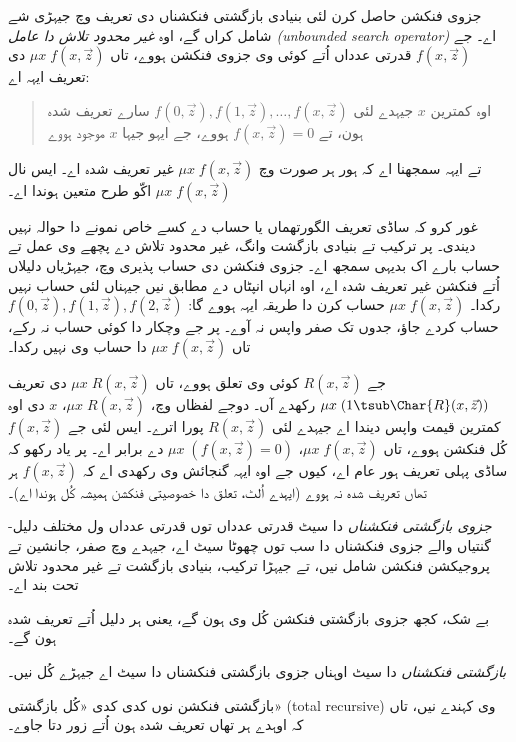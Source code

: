 \documentclass[../../../include/open-logic-section]{subfiles}
\begin{document}
جزوی فنکشن حاصل کرن لئی بنیادی بازگشتی فنکشناں
دی تعریف وچ جیہڑی شے شامل کراں گے، اوہ
\emph{غیر محدود تلاش دا عامل (unbounded search
  operator)} اے۔ جے $f(x,\vec z)$ قدرتی عدداں
اُتے کوئی وی جزوی فنکشن ہووے، تاں
$\mu x \; f(x,\vec z)$ دی تعریف ایہہ اے:
\begin{quote}
  اوہ کمترین $x$ جیہدے لئی $f(0,\vec z), f(1,\vec z), \dots, f(x,\vec
  z)$ سارے تعریف شدہ ہون، تے $f(x,\vec z) = 0$
  ہووے، جے ایہو جیہا $x$ موجود ہووے
\end{quote}
تے ایہہ سمجھنا اے کہ ہور ہر صورت وچ
$\mu x \; f(x,\vec z)$ غیر تعریف شدہ اے۔ ایس
نال $\mu x \; f(x,\vec z)$ اکّو طرح متعین
ہوندا اے۔

\begin{explain}
غور کرو کہ ساڈی تعریف  الگورتھماں یا حساب دے کسے خاص
نمونے دا حوالہ نہیں دیندی۔ پر ترکیب تے بنیادی
بازگشت وانگ، غیر محدود تلاش دے پچھے وی عمل تے
حساب بارے اک بدیہی سمجھ اے۔ جزوی فنکشن دی
حساب پذیری وچ، جیہڑیاں دلیلاں اُتے فنکشن غیر
تعریف شدہ اے، اوہ انہاں انپٹاں دے مطابق نیں
جیہناں لئی حساب نہیں رکدا۔ $\mu x \;
f(x,\vec z)$ حساب کرن دا طریقہ ایہہ ہووے گا:
$f(0,\vec z), f(1,\vec z),
f(2,\vec z)$ حساب کردے جاؤ، جدوں تک صفر
واپس نہ آوے۔ پر جے وچکار دا کوئی حساب نہ رکے،
تاں $\mu x \; f(x,\vec z)$ دا حساب وی نہیں
رکدا۔
\end{explain}

جے $R(x,\vec z)$ کوئی وی تعلق ہووے، تاں
$\mu x \; R(x,\vec z)$ دی تعریف
$\mu x \; (1 \tsub \Char{R}(x,\vec z))$
رکھدے آں۔ دوجے لفظاں وچ، $\mu x \;
R(x,\vec z)$، $x$ دی اوہ کمترین قیمت واپس
دیندا اے جیہدے لئی $R(x,\vec z)$ پورا اترے۔
ایس لئی جے $f(x,\vec z)$ کُل فنکشن ہووے، تاں
$\mu x \; f(x,\vec
z)$، $\mu x \; (f(x,\vec z) = 0)$ دے
برابر اے۔ پر یاد رکھو کہ ساڈی پہلی تعریف ہور
عام اے، کیوں جے اوہ ایہہ گنجائش وی رکھدی اے
کہ $f(x,\vec z)$ ہر تھاں تعریف شدہ نہ ہووے
(ایہدے اُلٹ، تعلق دا خصوصیتی فنکشن ہمیشہ کُل
ہوندا اے)۔

\begin{defn}
\emph{جزوی بازگشتی فنکشناں} دا سیٹ قدرتی عدداں
توں قدرتی عدداں ول مختلف دلیل-گنتیاں والے جزوی
فنکشناں دا سب توں چھوٹا سیٹ اے، جیہدے وچ صفر،
جانشین تے پروجیکشن فنکشن شامل نیں، تے جیہڑا
ترکیب، بنیادی بازگشت تے غیر محدود تلاش تحت بند اے۔
\end{defn}

بے شک، کجھ جزوی بازگشتی فنکشن کُل وی ہون گے،
یعنی ہر دلیل اُتے تعریف شدہ ہون گے۔

\begin{defn}
\emph{بازگشتی فنکشناں} دا سیٹ اوہناں جزوی
بازگشتی فنکشناں دا سیٹ اے جیہڑے کُل نیں۔
\end{defn}

بازگشتی فنکشن نوں کدی کدی «کُل بازگشتی»
(total recursive) وی کہندے نیں، تاں کہ اوہدے
ہر تھاں تعریف شدہ ہون اُتے زور دتا جاوے۔
\end{document}
